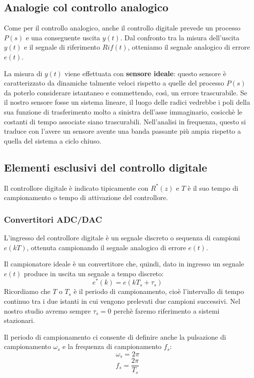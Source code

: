 \documentclass[a4paper]{report}
\newcommand{\bo}{\bfseries }
\begin{document}
\subsection{Analogie col controllo analogico}
Come per il controllo analogico, anche il controllo digitale prevede
un processo $P(s)$ e una conseguente uscita $y(t)$. Dal confronto tra
la misura dell'uscita $y(t)$ e il segnale di riferimento $Rif(t)$,
otteniamo il segnale analogico di errore $e(t)$.

La misura di $y(t)$ viene effettuata con {\bo sensore
  ideale}: questo sensore \`e caratterizzato da
dinamiche talmente veloci rispetto a quelle del processo $P(s)$ da poterlo
considerare istantaneo e commettendo, cos\`i, un errore
trascurabile. Se il nostro sensore fosse un sistema lineare, il luogo
delle radici vedrebbe i poli della sua funzione di trasferimento molto
a sinistra dell'asse immaginario, cosicch\`e le costanti di tempo
associate siano trascurabili. Nell'analisi in frequenza, questo si
traduce con l'avere un sensore avente una banda passante pi\`u ampia
rispetto a quella del sistema a ciclo chiuso.

\subsection{Elementi esclusivi del controllo digitale}
Il controllore digitale \`e indicato tipicamente con $R^{*}(z)$ e $T$
\`e il suo tempo di campionamento o
tempo di attivazione del controllore.

\subsubsection{Convertitori ADC/DAC}
L'ingresso del controllore digitale \`e un segnale discreto o sequenza
di campioni $e(kT)$, ottenuta campionando il segnale analogico di
errore $e(t)$.

Il campionatore ideale \`e un convertitore
che, quindi, dato in ingresso un segnale $e(t)$ produce in uscita un
segnale a tempo discreto:
\[
e^{*}(k) = e (kT_s + \tau_s)
\]
Ricordiamo che $T$ o $T_s$ \`e il periodo di campionamento, cio\`e l'intervallo di tempo continuo tra i due
istanti in cui vengono prelevati due campioni successivi. Nel nostro
studio avremo sempre $\tau_s = 0$ perch\`e faremo riferimento a
sistemi stazionari.

Il periodo di campionamento ci consente di definire anche la
pulsazione di campionamento
$\omega_s$ e la frequenza di campionamento $f_s$:
\[
\omega_s = 2 \pi
\]
\[
f_s = \dfrac{2 \pi}{T_s}
\]
\end{document}

